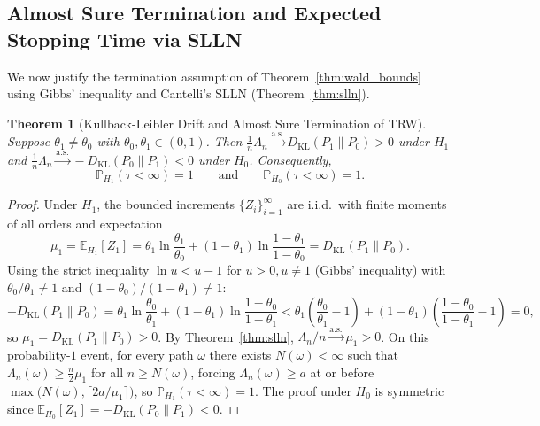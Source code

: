 \documentclass[oneside,noexaminfo,english]{sapthesis}
\numberwithin{equation}{section}
\numberwithin{figure}{section}
\numberwithin{table}{section}
\theoremstyle{compactplain}
\newtheorem{theorem}{Theorem}[section]
\theoremstyle{compactdef}
\theoremstyle{compactrem}
\newcommand{\E}{\mathbb{E}}
\newcommand{\Prob}{\mathbb{P}}
\newcommand{\DKL}{D_{\mathrm{KL}}}
\newcommand{\as}{\overset{\mathrm{a.s.}}{\longrightarrow}}
\begin{document}
\subsection{Almost Sure Termination and Expected Stopping Time via SLLN}
We now justify the termination assumption of Theorem~\ref{thm:wald_bounds} using Gibbs' inequality and Cantelli's SLLN (Theorem~\ref{thm:slln}).

\begin{theorem}[Kullback-Leibler Drift and Almost Sure Termination of TRW]
\label{thm:trw_slln}
Suppose $\theta_1 \neq \theta_0$ with $\theta_0, \theta_1 \in (0,1)$. Then $\frac{1}{n}\Lambda_n \as \DKL(P_1 \parallel P_0) > 0$ under $H_1$ and $\frac{1}{n}\Lambda_n \as -\DKL(P_0 \parallel P_1) < 0$ under $H_0$. Consequently,
\begin{equation}
    \label{eq:as_finite_tau}
    \Prob_{H_1}(\tau < \infty) = 1 \qquad \text{and} \qquad \Prob_{H_0}(\tau < \infty) = 1.
\end{equation}
\end{theorem}
\begin{proof}
Under $H_1$, the bounded increments $\{Z_i\}_{i=1}^\infty$ are i.i.d.\ with finite moments of all orders and expectation
\begin{equation}
    \label{eq:kl_def}
    \mu_1 = \E_{H_1}[Z_1] = \theta_1 \ln\frac{\theta_1}{\theta_0} + (1 - \theta_1)\ln\frac{1 - \theta_1}{1 - \theta_0} = \DKL(P_1 \parallel P_0).
\end{equation}
Using the strict inequality $\ln u < u - 1$ for $u > 0, u \neq 1$ (Gibbs' inequality) with $\theta_0 / \theta_1 \neq 1$ and $(1-\theta_0)/(1-\theta_1) \neq 1$:
\begin{equation*}
    -\DKL(P_1 \parallel P_0) = \theta_1 \ln\frac{\theta_0}{\theta_1} + (1-\theta_1)\ln\frac{1-\theta_0}{1-\theta_1}
    < \theta_1\!\left(\frac{\theta_0}{\theta_1} - 1\right) + (1-\theta_1)\!\left(\frac{1-\theta_0}{1-\theta_1} - 1\right) = 0,
\end{equation*}
so $\mu_1 = \DKL(P_1 \parallel P_0) > 0$. By Theorem~\ref{thm:slln}, $\Lambda_n / n \as \mu_1 > 0$. On this probability-$1$ event, for every path $\omega$ there exists $N(\omega) < \infty$ such that $\Lambda_n(\omega) \ge \frac{n}{2}\mu_1$ for all $n \ge N(\omega)$, forcing $\Lambda_n(\omega) \ge a$ at or before $\max\bigl(N(\omega), \lceil 2a/\mu_1 \rceil\bigr)$, so $\Prob_{H_1}(\tau < \infty) = 1$. The proof under $H_0$ is symmetric since $\E_{H_0}[Z_1] = -\DKL(P_0 \parallel P_1) < 0$.
\end{proof}
\end{document}
